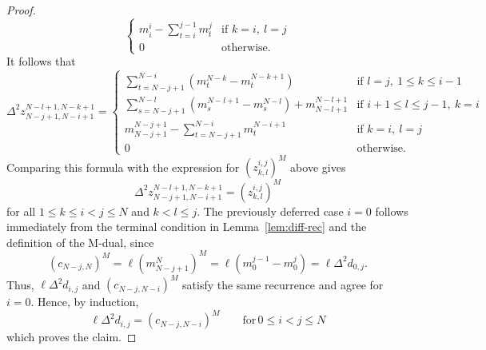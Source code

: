 \documentclass[pdflatex,sn-mathphys-num]{sn-jnl}%
\theoremstyle{thmstyleone}%
\theoremstyle{thmstyletwo}%
\theoremstyle{thmstylethree}%
\begin{document}
\begin{proof}
\[\begin{cases}
m^i_i-\displaystyle\sum_{t=i}^{j-1} m^{j}_{t}
&\text{if } k=i,\ l=j \\[10pt]

0
& \text{otherwise.}
\end{cases}
\]
It follows that
\[
\Delta^2 z^{N-l+1,N-k+1}_{N-j+1,N-i+1}
=
\begin{cases}
\displaystyle
\sum_{t=N-j+1}^{N-i}\left(m^{N-k}_t-m^{N-k+1}_t\right)
&\text{if } l=j,\ 1\le k \le i-1 \\[10pt]


\displaystyle
\sum_{s=N-j+1}^{N-l}\left(m^{N-l+1}_s-m^{N-l}_s\right)+m^{N-l+1}_{N-l+1}
&\text{if } i+1 \le l \le j-1,\ k=i\\[10pt]

m^{N-j+1}_{N-j+1}-\displaystyle\sum_{t=N-j+1}^{N-i} m^{N-i+1}_{t}
&\text{if } k=i,\ l=j \\[10pt]

0
& \text{otherwise.}
\end{cases}
\]
Comparing this formula with the expression for $(z_{k,l}^{i,j})^M$ above gives
\[\Delta^2 z_{N-j+1,N-i+1}^{N-l+1,N-k+1} = (z_{k,l}^{i,j})^M \]
for all $1\le k\le i<j\le N$ and $k<l\le j$.
The previously deferred case $i=0$ follows immediately from the
terminal condition in Lemma~\ref{lem:diff-rec} and the definition of the M-dual, since
\[(c_{N-j,N})^M = \ell(m_{N-j+1}^N)^M = \ell(m_0^{j-1}-m_0^j) = \ell\Delta^2d_{0,j}.\]
Thus, \(\ell\Delta^2 d_{i,j}\) and \((c_{N-j,N-i})^M\) satisfy the same
recurrence and agree for \(i=0\). Hence, by induction,
\[ \ell\Delta^2d_{i,j}=(c_{N-j,N-i})^M \qquad \text{for}\, 0\le i<j\le N \]
which proves the claim.

\end{proof}
\end{document}
